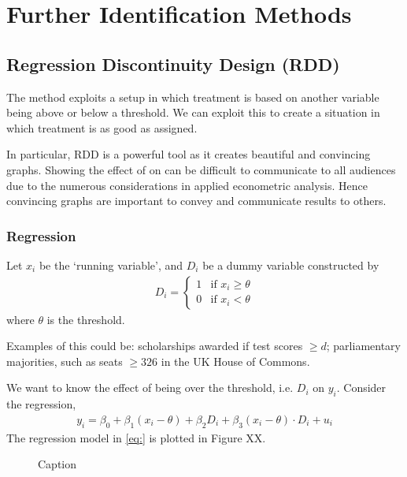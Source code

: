\chapter{Further Identification Methods}
    \section{Regression Discontinuity Design (RDD)}
        The method exploits a setup in which treatment is based on another variable being above or below a threshold. We can exploit this to create a situation in which treatment is as good as assigned.

    	In particular, RDD is a powerful tool as it creates beautiful and convincing graphs. Showing the effect of  on  can be difficult to communicate to all audiences due to the numerous considerations in applied econometric analysis. Hence convincing graphs are important to convey and communicate results to others.

        \subsection{Regression}
            Let $x_i$ be the `running variable', and $D_i$ be a dummy variable constructed by
            \begin{align}
                D_i =
                \begin{cases}
                    1 &\text{if }x_{i} \geq \theta   \\
                    0 &\text{if }x_{i} < \theta
                \end{cases}
            \end{align}
            where $\theta$ is the threshold.

            Examples of this could be: scholarships awarded if test scores $\geq d$; parliamentary majorities, such as seats $\geq 326$ in the UK House of Commons.

            We want to know the effect of being over the threshold, i.e. $D_i$ on $y_i$. Consider the regression,
            \begin{align}
                y_i = \beta_0 +\beta_1 (x_i-\theta) + \beta_2 D_i + \beta_3 (x_i-\theta)\cdot D_i+u_i
            \end{align}
            The regression model in \eqref{eq:} is plotted in Figure XX.
            \begin{figure}
                \centering
                \caption{Caption}
                \label{fig:enter-label}
            \end{figure}

